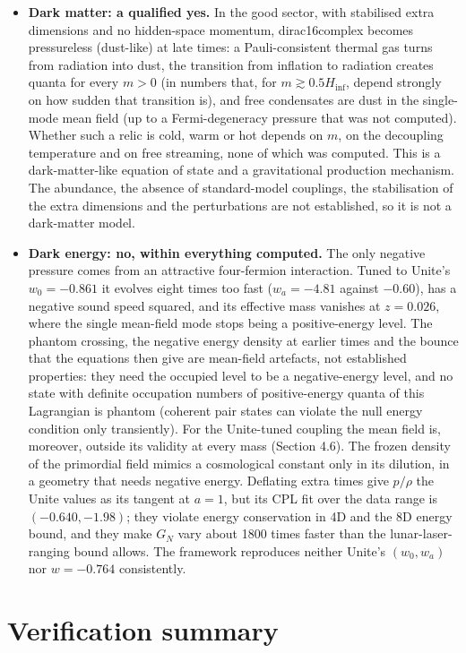 \documentclass[11pt]{article}
\begin{document}
\begin{itemize}
\item \textbf{Dark matter: a qualified yes.} In the good sector, with stabilised extra dimensions and no hidden-space momentum, dirac16complex becomes pressureless (dust-like) at late times: a Pauli-consistent thermal gas turns from radiation into dust, the transition from inflation to radiation creates quanta for every $m>0$ (in numbers that, for $m\gtrsim0.5H_{\mathrm{inf}}$, depend strongly on how sudden that transition is), and free condensates are dust in the single-mode mean field (up to a Fermi-degeneracy pressure that was not computed). Whether such a relic is cold, warm or hot depends on $m$, on the decoupling temperature and on free streaming, none of which was computed. This is a dark-matter-like equation of state and a gravitational production mechanism. The abundance, the absence of standard-model couplings, the stabilisation of the extra dimensions and the perturbations are not established, so it is not a dark-matter model.
\item \textbf{Dark energy: no, within everything computed.} The only negative pressure comes from an attractive four-fermion interaction. Tuned to Unite's $w_0=-0.861$ it evolves eight times too fast ($w_a=-4.81$ against $-0.60$), has a negative sound speed squared, and its effective mass vanishes at $z=0.026$, where the single mean-field mode stops being a positive-energy level. The phantom crossing, the negative energy density at earlier times and the bounce that the equations then give are mean-field artefacts, not established properties: they need the occupied level to be a negative-energy level, and no state with definite occupation numbers of positive-energy quanta of this Lagrangian is phantom (coherent pair states can violate the null energy condition only transiently). For the Unite-tuned coupling the mean field is, moreover, outside its validity at every mass (Section 4.6). The frozen density of the primordial field mimics a cosmological constant only in its dilution, in a geometry that needs negative energy. Deflating extra times give $p/\rho$ the Unite values as its tangent at $a=1$, but its CPL fit over the data range is $(-0.640,-1.98)$; they violate energy conservation in 4D and the 8D energy bound, and they make $G_N$ vary about 1800 times faster than the lunar-laser-ranging bound allows. The framework reproduces neither Unite's $(w_0,w_a)$ nor $w=-0.764$ consistently.
\end{itemize}

\section{Verification summary}
\end{document}
